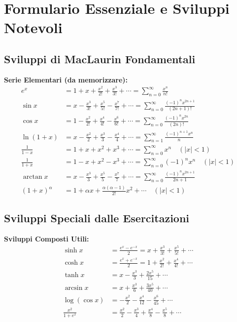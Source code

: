 \section{Formulario Essenziale e Sviluppi Notevoli}

\subsection{Sviluppi di MacLaurin Fondamentali}

\begin{info}
\textbf{Serie Elementari (da memorizzare):}
\begin{align}
e^x &= 1 + x + \frac{x^2}{2!} + \frac{x^3}{3!} + \cdots = \sum_{n=0}^{\infty} \frac{x^n}{n!} \\
\sin x &= x - \frac{x^3}{3!} + \frac{x^5}{5!} - \frac{x^7}{7!} + \cdots = \sum_{n=0}^{\infty} \frac{(-1)^n x^{2n+1}}{(2n+1)!} \\
\cos x &= 1 - \frac{x^2}{2!} + \frac{x^4}{4!} - \frac{x^6}{6!} + \cdots = \sum_{n=0}^{\infty} \frac{(-1)^n x^{2n}}{(2n)!} \\
\ln(1+x) &= x - \frac{x^2}{2} + \frac{x^3}{3} - \frac{x^4}{4} + \cdots = \sum_{n=1}^{\infty} \frac{(-1)^{n+1} x^n}{n} \\
\frac{1}{1-x} &= 1 + x + x^2 + x^3 + \cdots = \sum_{n=0}^{\infty} x^n \quad (|x| < 1) \\
\frac{1}{1+x} &= 1 - x + x^2 - x^3 + \cdots = \sum_{n=0}^{\infty} (-1)^n x^n \quad (|x| < 1) \\
\arctan x &= x - \frac{x^3}{3} + \frac{x^5}{5} - \frac{x^7}{7} + \cdots = \sum_{n=0}^{\infty} \frac{(-1)^n x^{2n+1}}{2n+1} \\
(1+x)^\alpha &= 1 + \alpha x + \frac{\alpha(\alpha-1)}{2!}x^2 + \cdots \quad (|x| < 1)
\end{align}
\end{info}

\subsection{Sviluppi Speciali dalle Esercitazioni}

\begin{info}
\textbf{Sviluppi Composti Utili:}
\begin{align}
\sinh x &= \frac{e^x - e^{-x}}{2} = x + \frac{x^3}{3!} + \frac{x^5}{5!} + \cdots \\
\cosh x &= \frac{e^x + e^{-x}}{2} = 1 + \frac{x^2}{2!} + \frac{x^4}{4!} + \cdots \\
\tanh x &= x - \frac{x^3}{3} + \frac{2x^5}{15} + \cdots \\
\arcsin x &= x + \frac{x^3}{6} + \frac{3x^5}{40} + \cdots \\
\log(\cos x) &= -\frac{x^2}{2} - \frac{x^4}{12} - \frac{x^6}{45} + \cdots \\
\frac{x^2}{1+e^x} &= \frac{x^2}{2} - \frac{x^3}{4} + \frac{x^4}{8} - \frac{x^5}{8} + \cdots
\end{align}
\end{info}

